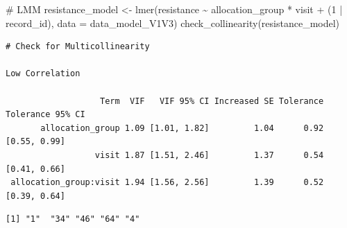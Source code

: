 \documentclass[
  12pt,
]{article}
\newenvironment{Shaded}{\begin{snugshade}}{\end{snugshade}}
\newcommand{\AttributeTok}[1]{\textcolor[rgb]{0.40,0.45,0.13}{#1}}
\newcommand{\CommentTok}[1]{\textcolor[rgb]{0.37,0.37,0.37}{#1}}
\newcommand{\DecValTok}[1]{\textcolor[rgb]{0.68,0.00,0.00}{#1}}
\newcommand{\FunctionTok}[1]{\textcolor[rgb]{0.28,0.35,0.67}{#1}}
\newcommand{\NormalTok}[1]{\textcolor[rgb]{0.00,0.23,0.31}{#1}}
\newcommand{\OtherTok}[1]{\textcolor[rgb]{0.00,0.23,0.31}{#1}}
\newcommand{\SpecialCharTok}[1]{\textcolor[rgb]{0.37,0.37,0.37}{#1}}
\newcommand{\StringTok}[1]{\textcolor[rgb]{0.13,0.47,0.30}{#1}}
\begin{document}
\begin{Shaded}
\begin{Highlighting}[]
\CommentTok{\# LMM}
\NormalTok{resistance\_model }\OtherTok{\textless{}{-}} \FunctionTok{lmer}\NormalTok{(resistance }\SpecialCharTok{\textasciitilde{}}\NormalTok{ allocation\_group }\SpecialCharTok{*}\NormalTok{ visit }\SpecialCharTok{+} 
\NormalTok{(}\DecValTok{1} \SpecialCharTok{|}\NormalTok{ record\_id), }\AttributeTok{data =}\NormalTok{ data\_model\_V1V3)}
\FunctionTok{check\_collinearity}\NormalTok{(resistance\_model)}
\end{Highlighting}
\end{Shaded}

\begin{verbatim}
# Check for Multicollinearity

Low Correlation

                   Term  VIF   VIF 95% CI Increased SE Tolerance Tolerance 95% CI
       allocation_group 1.09 [1.01, 1.82]         1.04      0.92     [0.55, 0.99]
                  visit 1.87 [1.51, 2.46]         1.37      0.54     [0.41, 0.66]
 allocation_group:visit 1.94 [1.56, 2.56]         1.39      0.52     [0.39, 0.64]
\end{verbatim}

\begin{Shaded}
\end{Shaded}

\begin{verbatim}
[1] "1"  "34" "46" "64" "4" 
\end{verbatim}
\end{document}
